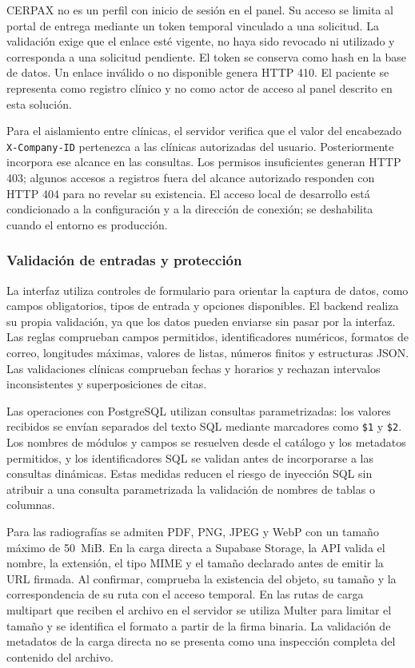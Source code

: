 CERPAX no es un perfil con inicio de sesión en el panel. Su acceso se limita
al portal de entrega mediante un token temporal vinculado a una solicitud.
La validación exige que el enlace esté vigente, no haya sido revocado ni
utilizado y corresponda a una solicitud pendiente. El token se conserva
como hash en la base de datos. Un enlace inválido o no disponible genera
HTTP 410. El paciente se representa como registro clínico y no como actor
de acceso al panel descrito en esta solución.

Para el aislamiento entre clínicas, el servidor verifica que el valor del
encabezado \texttt{X-Company-ID} pertenezca a las clínicas autorizadas del
usuario. Posteriormente incorpora ese alcance en las consultas. Los
permisos insuficientes generan HTTP 403; algunos accesos a registros fuera
del alcance autorizado responden con HTTP 404 para no revelar su existencia.
El acceso local de desarrollo está condicionado a la configuración y a
la dirección de conexión; se deshabilita cuando el entorno es producción.

\subsubsection{Validación de entradas y protección}

La interfaz utiliza controles de formulario para orientar la captura de
datos, como campos obligatorios, tipos de entrada y opciones disponibles.
El backend realiza su propia validación, ya que los datos pueden enviarse
sin pasar por la interfaz. Las reglas comprueban campos permitidos,
identificadores numéricos, formatos de correo, longitudes máximas,
valores de listas, números finitos y estructuras JSON. Las validaciones
clínicas comprueban fechas y horarios y rechazan intervalos inconsistentes
y superposiciones de citas.

Las operaciones con PostgreSQL utilizan consultas parametrizadas: los
valores recibidos se envían separados del texto SQL mediante marcadores
como \texttt{\$1} y \texttt{\$2}. Los nombres de módulos y campos se
resuelven desde el catálogo y los metadatos permitidos, y los identificadores
SQL se validan antes de incorporarse a las consultas dinámicas. Estas
medidas reducen el riesgo de inyección SQL sin atribuir a una consulta
parametrizada la validación de nombres de tablas o columnas.

Para las radiografías se admiten PDF, PNG, JPEG y WebP con un tamaño máximo
de \mbox{50 MiB}. En la carga directa a Supabase Storage, la API valida el
nombre, la extensión, el tipo MIME y el tamaño declarado antes de emitir
la URL firmada. Al confirmar, comprueba la existencia del objeto, su tamaño
y la correspondencia de su ruta con el acceso temporal. En las rutas de
carga multipart que reciben el archivo en el servidor se utiliza Multer
para limitar el tamaño y se identifica el formato a partir de la firma
binaria. La validación de metadatos de la carga directa no se presenta como
una inspección completa del contenido del archivo.

